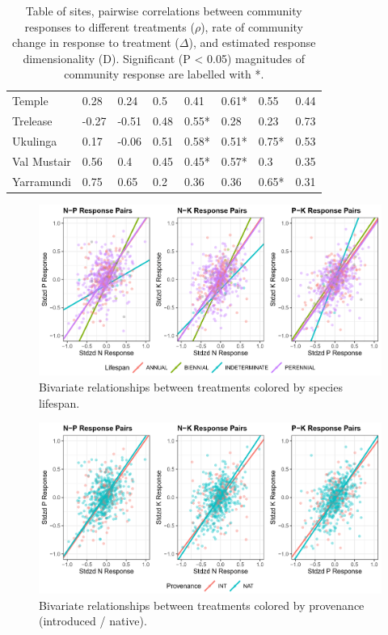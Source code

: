 \documentclass[twoside,12pt,final]{ucthesis-CA2012}
\begin{document}
\begin{ucmainmatter}
\begin{table}[ht]
{\begin{tabular}{llllllll}
  Temple & 0.28 & 0.24 & 0.5 & 0.41 & 0.61* & 0.55 & 0.44 \\ 
  Trelease & -0.27 & -0.51 & 0.48 & 0.55* & 0.28 & 0.23 & 0.73 \\ 
  Ukulinga & 0.17 & -0.06 & 0.51 & 0.58* & 0.51* & 0.75* & 0.53 \\ 
  Val Mustair & 0.56 & 0.4 & 0.45 & 0.45* & 0.57* & 0.3 & 0.35 \\ 
  Yarramundi & 0.75 & 0.65 & 0.2 & 0.36 & 0.36 & 0.65* & 0.31 \\ 
   \hline
\end{tabular}
}
\caption{Table of sites, pairwise correlations between community responses to different treatments ($\rho$), rate of community change in response to treatment ($\Delta$), and estimated response dimensionality (D). Significant (P < 0.05) magnitudes of community response are labelled with *.} 
\end{table}
\begin{figure}
\centering
\includegraphics[width=\textwidth,height=0.4\textheight]{figure/AppFig1_1.png}
\caption{Bivariate relationships between treatments colored by species lifespan. \label{app-1-1}}
\end{figure}
\begin{figure}
\centering
\includegraphics[width=\textwidth,height=0.4\textheight]{figure/AppFig1_2.png}
\caption{Bivariate relationships between treatments colored by provenance (introduced / native). \label{app-1-2}}
\end{figure}
\hypertarget{chapter-2-supporting-information}{%
}
\end{ucmainmatter}
\end{document}
